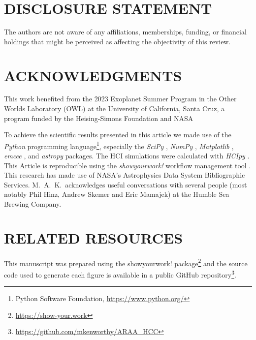 \documentclass[letterpaper]{ar-1col}
\newcommand{\project}[1]{\textsf{#1}}
\begin{document}
\section*{DISCLOSURE STATEMENT}
The authors are not aware of any affiliations, memberships, funding, or financial holdings that
might be perceived as affecting the objectivity of this review.

\section*{ACKNOWLEDGMENTS}
This work benefited from the 2023 Exoplanet Summer Program in the Other Worlds Laboratory (OWL) at the University of California, Santa Cruz, a program funded by the Heising-Simons Foundation and NASA
%

To achieve the scientific results presented in this article we made use of the \emph{Python} programming language\footnote{Python Software Foundation, \url{https://www.python.org/}}, especially the \emph{SciPy} \citep{virtanen2020}, \emph{NumPy} \citep{numpy}, \emph{Matplotlib} \citep{Matplotlib}, \emph{emcee} \citep{foreman-mackey2013}, and \emph{astropy} \citep{astropy_1,astropy_2} packages.
%
The HCI simulations were calculated with \emph{HCIpy} \citep{Por18}.
%
This Article is reproducible using the \emph{showyourwork!} workflow management tool \citep{Luger2021}.
%
This research has made use of NASA's Astrophysics Data System Bibliographic Services.
%
M.\ A.\ K.\ acknowledges useful conversations with several people (most notably
Phil Hinz, Andrew Skemer and Eric Mamajek) at the Humble Sea Brewing Company.





\section*{RELATED RESOURCES}

This manuscript was prepared using the \project{showyourwork!} package\footnote{\url{https://show-your.work}} and the source code used to generate each figure is available in a public \project{GitHub} repository\footnote{\url{https://github.com/mkenworthy/ARAA_HCC}}.
\end{document}
